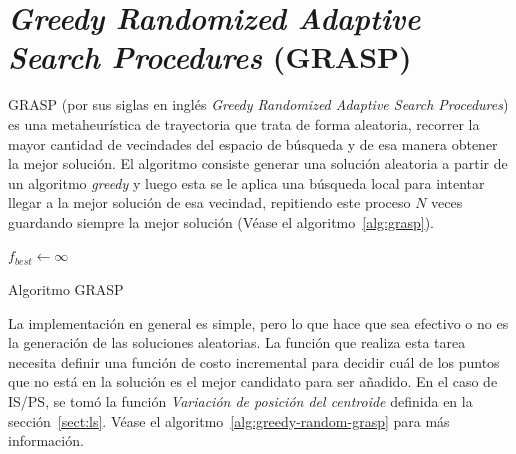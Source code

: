 \documentclass{ci5652}
\begin{document}
\section{\textit{\textbf{Greedy Randomized Adaptive Search Procedures}} (GRASP)}

GRASP (por sus siglas en inglés \textit{Greedy Randomized Adaptive Search Procedures}) es una metaheurística de trayectoria que trata de forma aleatoria, recorrer la mayor cantidad de vecindades del espacio de búsqueda y de esa manera obtener la mejor solución. El algoritmo consiste generar una solución aleatoria a partir de un algoritmo \textit{greedy} y luego esta se le aplica una búsqueda local para intentar llegar a la mejor solución de esa vecindad, repitiendo este proceso $N$ veces guardando siempre la mejor solución (Véase el algoritmo~\ref{alg:grasp}).

\begin{algorithm}
    \DontPrintSemicolon
    \vspace*{0.1cm}

    $f_{best} \leftarrow \infty$\;
    \vspace*{0.1cm}
    \caption{Algoritmo GRASP}
    \label{alg:grasp}
\end{algorithm}
La implementación en general es simple, pero lo que hace que sea efectivo o no es la generación de las soluciones aleatorias. La función que realiza esta tarea necesita definir una función de costo incremental para decidir cuál de los puntos que no está en la solución es el mejor candidato para ser añadido. En el caso de IS/PS, se tomó la función \textit{Variación de posición del centroide} definida en la sección~\ref{sect:ls}. Véase el algoritmo~\ref{alg:greedy-random-grasp} para más información.
\end{document}
